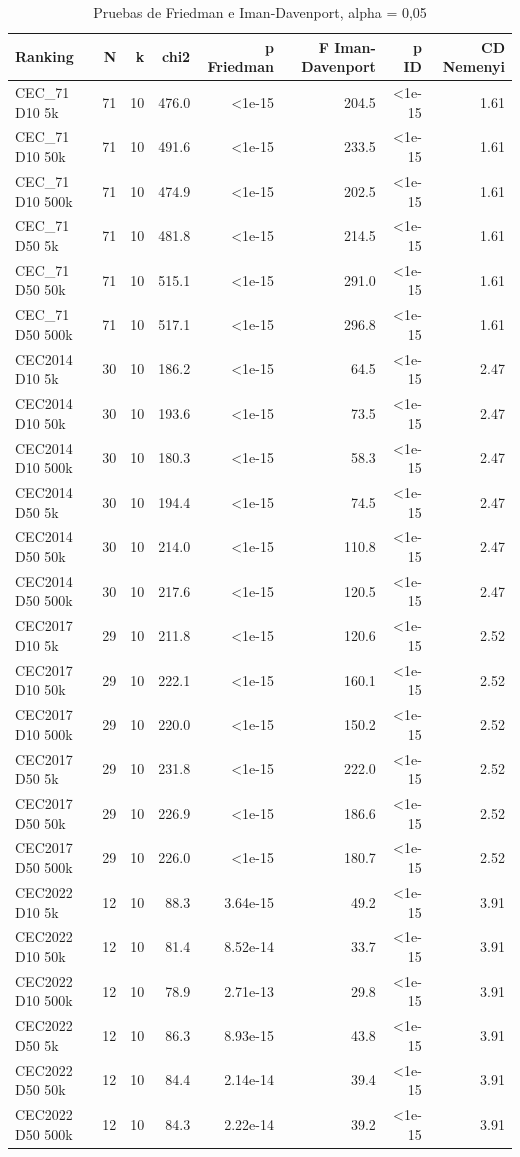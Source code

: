 \begin{table}[ht]\centering\small
\caption{Pruebas de Friedman e Iman-Davenport, alpha = 0,05}
\begin{tabular}{lrrrrrrr}
\toprule
Ranking & N & k & chi2 & p Friedman & F Iman-Davenport & p ID & CD Nemenyi \\
\midrule
CEC\_71 D10 5k & 71 & 10 & 476.0 & <1e-15 & 204.5 & <1e-15 & 1.61 \\
CEC\_71 D10 50k & 71 & 10 & 491.6 & <1e-15 & 233.5 & <1e-15 & 1.61 \\
CEC\_71 D10 500k & 71 & 10 & 474.9 & <1e-15 & 202.5 & <1e-15 & 1.61 \\
CEC\_71 D50 5k & 71 & 10 & 481.8 & <1e-15 & 214.5 & <1e-15 & 1.61 \\
CEC\_71 D50 50k & 71 & 10 & 515.1 & <1e-15 & 291.0 & <1e-15 & 1.61 \\
CEC\_71 D50 500k & 71 & 10 & 517.1 & <1e-15 & 296.8 & <1e-15 & 1.61 \\
CEC2014 D10 5k & 30 & 10 & 186.2 & <1e-15 & 64.5 & <1e-15 & 2.47 \\
CEC2014 D10 50k & 30 & 10 & 193.6 & <1e-15 & 73.5 & <1e-15 & 2.47 \\
CEC2014 D10 500k & 30 & 10 & 180.3 & <1e-15 & 58.3 & <1e-15 & 2.47 \\
CEC2014 D50 5k & 30 & 10 & 194.4 & <1e-15 & 74.5 & <1e-15 & 2.47 \\
CEC2014 D50 50k & 30 & 10 & 214.0 & <1e-15 & 110.8 & <1e-15 & 2.47 \\
CEC2014 D50 500k & 30 & 10 & 217.6 & <1e-15 & 120.5 & <1e-15 & 2.47 \\
CEC2017 D10 5k & 29 & 10 & 211.8 & <1e-15 & 120.6 & <1e-15 & 2.52 \\
CEC2017 D10 50k & 29 & 10 & 222.1 & <1e-15 & 160.1 & <1e-15 & 2.52 \\
CEC2017 D10 500k & 29 & 10 & 220.0 & <1e-15 & 150.2 & <1e-15 & 2.52 \\
CEC2017 D50 5k & 29 & 10 & 231.8 & <1e-15 & 222.0 & <1e-15 & 2.52 \\
CEC2017 D50 50k & 29 & 10 & 226.9 & <1e-15 & 186.6 & <1e-15 & 2.52 \\
CEC2017 D50 500k & 29 & 10 & 226.0 & <1e-15 & 180.7 & <1e-15 & 2.52 \\
CEC2022 D10 5k & 12 & 10 & 88.3 & 3.64e-15 & 49.2 & <1e-15 & 3.91 \\
CEC2022 D10 50k & 12 & 10 & 81.4 & 8.52e-14 & 33.7 & <1e-15 & 3.91 \\
CEC2022 D10 500k & 12 & 10 & 78.9 & 2.71e-13 & 29.8 & <1e-15 & 3.91 \\
CEC2022 D50 5k & 12 & 10 & 86.3 & 8.93e-15 & 43.8 & <1e-15 & 3.91 \\
CEC2022 D50 50k & 12 & 10 & 84.4 & 2.14e-14 & 39.4 & <1e-15 & 3.91 \\
CEC2022 D50 500k & 12 & 10 & 84.3 & 2.22e-14 & 39.2 & <1e-15 & 3.91 \\
\bottomrule
\end{tabular}
\end{table}
